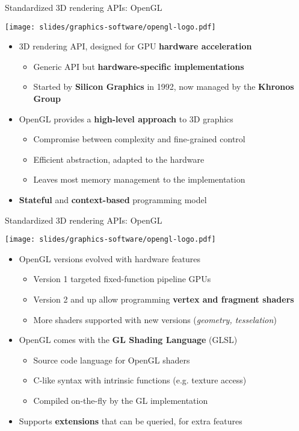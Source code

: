 \begin{frame}[t]{Standardized 3D rendering APIs: OpenGL}
  \begin{center}
  \texttt{[image: slides/graphics-software/opengl-logo.pdf]}
  \end{center}

  \begin{itemize}
  \item 3D rendering API, designed for GPU \textbf{hardware acceleration}
    \begin{itemize}
    \item Generic API but \textbf{hardware-specific implementations}
    \item Started by \textbf{Silicon Graphics} in 1992, now managed by the \textbf{Khronos Group}
    \end{itemize}
  \item OpenGL provides a \textbf{high-level approach} to 3D graphics
    \begin{itemize}
    \item Compromise between complexity and fine-grained control
    \item Efficient abstraction, adapted to the hardware
    \item Leaves most memory management to the implementation
    \end{itemize}
  \item \textbf{Stateful} and \textbf{context-based} programming model
  \end{itemize}
\end{frame}

\begin{frame}[t]{Standardized 3D rendering APIs: OpenGL}
  \begin{center}
  \texttt{[image: slides/graphics-software/opengl-logo.pdf]}
  \end{center}

  \begin{itemize}
  \item OpenGL versions evolved with hardware features
    \begin{itemize}
    \item Version 1 targeted fixed-function pipeline GPUs
    \item Version 2 and up allow programming \textbf{vertex and fragment shaders}
    \item More shaders supported with new versions (\textit{geometry, tesselation})
    \end{itemize}
  \item OpenGL comes with the \textbf{GL Shading Language} (GLSL)
    \begin{itemize}
    \item Source code language for OpenGL shaders
    \item C-like syntax with intrinsic functions (e.g. texture access)
    \item Compiled on-the-fly by the GL implementation
    \end{itemize}
  \item Supports \textbf{extensions} that can be queried, for extra features
  \end{itemize}
\end{frame}

